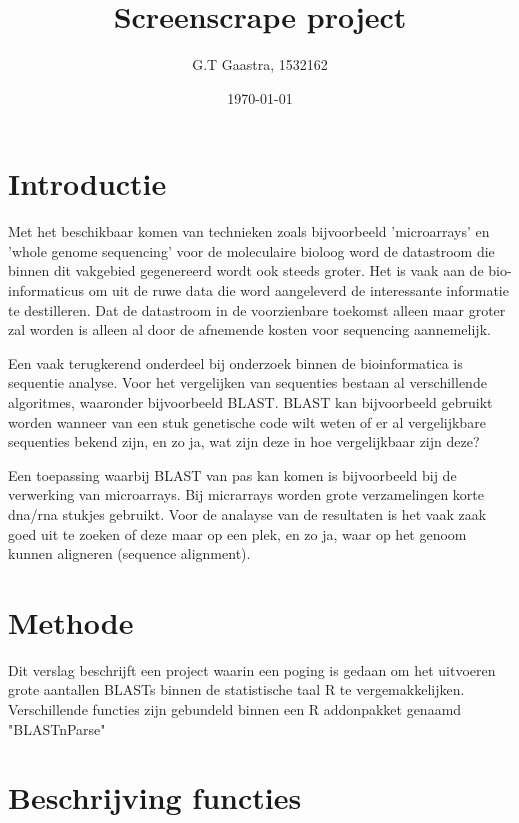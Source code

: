 \documentclass[10pt]{article}
\title{Screenscrape project}
\author{G.T Gaastra, 1532162}
\date{\today}
\begin{document}
\maketitle

 


\section*{Introductie}
Met het beschikbaar komen van technieken zoals bijvoorbeeld 'microarrays' en 'whole genome sequencing' voor de moleculaire bioloog word de datastroom die binnen dit vakgebied gegenereerd wordt ook steeds groter. Het is vaak aan de bio-informaticus om uit de ruwe data die word aangeleverd de interessante informatie te destilleren. Dat de datastroom in de voorzienbare toekomst alleen maar groter zal worden is alleen al door de afnemende kosten voor sequencing aannemelijk\cite{seq}.

Een vaak terugkerend onderdeel bij onderzoek binnen de bioinformatica is sequentie analyse. Voor het vergelijken van sequenties bestaan al verschillende algoritmes, waaronder  bijvoorbeeld BLAST\cite{BLAST}. BLAST kan bijvoorbeeld gebruikt worden wanneer van een stuk genetische code wilt weten of er al vergelijkbare sequenties bekend zijn, en zo ja, wat zijn deze in hoe vergelijkbaar zijn deze?

Een toepassing waarbij BLAST van pas kan komen is bijvoorbeeld bij de verwerking van microarrays. Bij micrarrays worden grote verzamelingen korte dna/rna stukjes gebruikt. Voor de analayse van de resultaten is het vaak zaak goed uit te zoeken of deze maar op een plek, en zo ja, waar op het genoom kunnen aligneren (sequence alignment).

\section*{Methode}
Dit verslag beschrijft een project waarin een poging is gedaan om het uitvoeren grote aantallen BLASTs binnen de statistische taal R\cite{Rcran} te vergemakkelijken. Verschillende functies zijn gebundeld binnen een R addonpakket genaamd "BLASTnParse"

\section*{Beschrijving functies}
\end{document}

